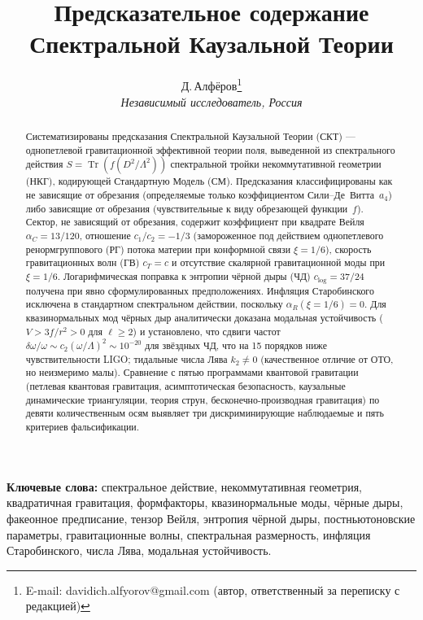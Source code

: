 \documentclass[12pt,a4paper]{article}
\title{Предсказательное содержание Спектральной Каузальной Теории}
\author{Д.\,Алфёров\thanks{E-mail: davidich.alfyorov@gmail.com (автор, ответственный за переписку с редакцией)}\\[4pt]
\small\textit{Независимый исследователь, Россия}}
\date{}
\theoremstyle{plain}
\theoremstyle{definition}
\theoremstyle{remark}
\newcommand{\Tr}{\operatorname{Tr}}
\begin{document}
\maketitle

\begin{abstract}

Систематизированы предсказания Спектральной Каузальной Теории (СКТ) ---
однопетлевой гравитационной эффективной теории поля, выведенной из
спектрального действия $S = \Tr(f(D^2/\Lambda^2))$ спектральной тройки некоммутативной геометрии (НКГ),
кодирующей Стандартную Модель (СМ). Предсказания
классифицированы как не зависящие от обрезания (определяемые только
коэффициентом Сили--Де~Витта~$a_4$) либо зависящие от обрезания
(чувствительные к виду обрезающей функции~$f$). Сектор, не зависящий
от обрезания, содержит коэффициент при квадрате Вейля
$\alpha_C = 13/120$, отношение $c_1/c_2 = -1/3$ (замороженное
под действием однопетлевого ренормгруппового (РГ) потока материи при
конформной связи $\xi = 1/6$), скорость гравитационных волн (ГВ) $c_T = c$
и отсутствие скалярной гравитационной моды при $\xi = 1/6$.
Логарифмическая поправка к энтропии чёрной дыры (ЧД) $c_{\log} = 37/24$
получена при явно сформулированных предположениях. Инфляция
Старобинского исключена в стандартном спектральном действии, поскольку
$\alpha_R(\xi = 1/6) = 0$. Для квазинормальных мод чёрных дыр аналитически доказана модальная
устойчивость ($V > 3f/r^2 > 0$ для $\ell \geq 2$) и установлено, что
сдвиги частот $\delta\omega/\omega \sim c_2(\omega/\Lambda)^2 \sim
10^{-20}$ для звёздных ЧД, что на 15 порядков ниже чувствительности
LIGO; тидальные числа Лява $k_2 \neq 0$ (качественное отличие от
ОТО, но неизмеримо малы). Сравнение с пятью программами квантовой
гравитации (петлевая квантовая гравитация, асимптотическая
безопасность, каузальные динамические триангуляции, теория струн,
бесконечно-производная гравитация) по девяти количественным осям
выявляет три дискриминирующие наблюдаемые и пять критериев
фальсификации.

\end{abstract}

\bigskip\noindent\textbf{Ключевые слова:}
спектральное действие,
некоммутативная геометрия,
квадратичная гравитация,
формфакторы,
квазинормальные моды,
чёрные дыры,
факеонное предписание,
тензор Вейля,
энтропия чёрной дыры,
постньютоновские параметры,
гравитационные волны,
спектральная размерность,
инфляция Старобинского,
числа Лява,
модальная устойчивость.
\end{document}
